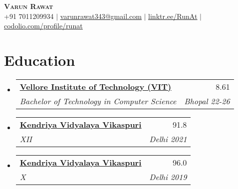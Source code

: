 \documentclass[letterpaper,11pt]{article}
\makeatletter
\newcommand{\resumeSubheading}[4]{
  \vspace{-2pt}\item
    \begin{tabular*}{0.97\textwidth}[t]{l@{\extracolsep{\fill}}r}
      \textbf{#1} & #2 \\
      \textit{\small#3} & \textit{\small #4} \\
    \end{tabular*}\vspace{-7pt}
}
\newcommand{\resumeSubHeadingListStart}{\begin{itemize}[leftmargin=0.15in, label={}]}
\newcommand{\resumeSubHeadingListEnd}{\end{itemize}}
\makeatother
\begin{document}

\begin{center}
    \textbf{\Huge \scshape Varun Rawat} \\ \vspace{1pt}
    \small +91 7011209934 $|$ \href{mailto:x@x.com}{\underline{varunrawat343@gmail.com}} $|$
    \href{https://linktr.ee/RunAt}{\underline{linktr.ee/RunAt}} $|$
    \href{https://codolio.com/profile/runat}{{\underline{codolio.com/profile/runat}}} 
\end{center}


\section{Education}
  \resumeSubHeadingListStart
    \resumeSubheading
     {\href{https://docs.google.com/spreadsheets/d/19a68PIKOImr63zxaMRBh5_TT5QhfCflCdVP_iLUBAFA/edit?usp=sharing}{\underline{Vellore Institute of Technology (VIT)}}}{8.61}
      {Bachelor of Technology in Computer Science}{Bhopal 22-26} 
    \resumeSubheading
      {\href{https://drive.google.com/file/d/1LhjRN9nKZUrEI_x_dg5Rs11GOEKDgBPe/view?usp=sharing}{\underline{Kendriya Vidyalaya Vikaspuri}}}{91.8}
      {XII}{Delhi 2021}
    \resumeSubheading
      {\href{https://drive.google.com/file/d/1LvgllHb9-usPZJz8zXVWFP2KLiAmjP0g/view?usp=sharing}{\underline{Kendriya Vidyalaya Vikaspuri}}}{96.0}
      {X}{Delhi 2019}
  \resumeSubHeadingListEnd

\end{document}
